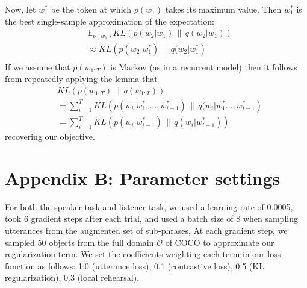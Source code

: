 \documentclass[11pt,a4paper]{article}
\newcommand{\KL}[2]{\ensuremath{KL\left({#1}\, \| \, {#2}\right)}}
\begin{document}
Now, let $w^{*}_1$ be the token at which $p(w_1)$ takes its maximum value.
Then $w^{*}_1$ is the best single-sample approximation of the expectation:
\begin{equation*}
\begin{split}
& \mathbb{E}_{p(w_1)} \KL{p(w_2 | w_1)}{q(w_2 | w_1)} \\
& \approx \KL{p(w_2 | w^{*}_1)}{q(w_2|w^{*}_1}\\
\end{split}
\end{equation*}
If we assume that $p(w_{1:T})$ is Markov (as in a recurrent model) then it follows from repeatedly applying the lemma that
\begin{equation*}
\begin{split}
& \KL{p(w_{1:T})}{q(w_{1:T})} \\
& = \sum_{i=1}^T \KL{p(w_i | w^{*}_1, \dots, w^*_{i-1})}{q(w_i|w^*_1\dots, w^*_{i-1}}\\
& = \sum_{i=1}^T \KL{p(w_i | w^*_{i-1})}{q(w_i | w^*_{i-1})}
\end{split}
\end{equation*}
recovering our objective.


\section*{Appendix B: Parameter settings}

For both the speaker task and listener task, we used a learning rate of 0.0005, took 6 gradient steps after each trial, and used a batch size of 8 when sampling utterances from the augmented set of sub-phrases, 
At each gradient step, we sampled 50 objects from the full domain $\mathcal{O}$ of COCO to approximate our regularization term.
We set the coefficients weighting each term in our loss function as follows: 1.0 (utterance loss), 0.1 (contrastive loss), 0.5 (KL regularization), 0.3 (local rehearsal).
\end{document}
